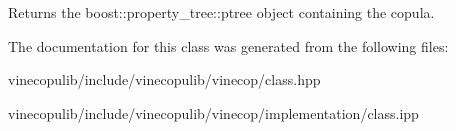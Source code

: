 \begin{DoxyReturn}{Returns}
the boost\+::property\+\_\+tree\+::ptree object containing the copula. 
\end{DoxyReturn}


The documentation for this class was generated from the following files\+:\begin{DoxyCompactItemize}
\item 
vinecopulib/include/vinecopulib/vinecop/class.\+hpp\item 
vinecopulib/include/vinecopulib/vinecop/implementation/class.\+ipp\end{DoxyCompactItemize}
